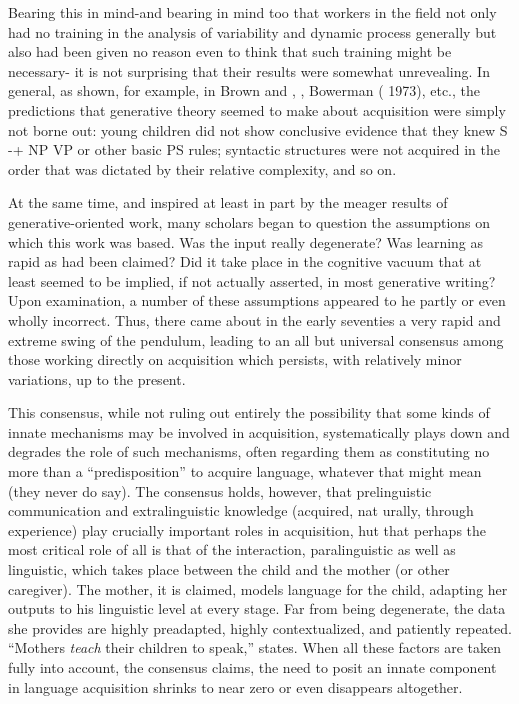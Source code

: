 Bearing this in mind-and bearing in mind too that workers in the field not only had no training in the analysis of variability and dynamic process generally but also had been given no reason even to think that such training might be necessary- it is not surprising that their results were somewhat unrevealing. In general, as shown, for example, in Brown and \citet{Hanlon1970}, \citet{Brown1973}, Bowerman ( 1973), etc., the predictions that generative theory seemed to make about acquisition were simply not borne out: young children did not
show conclusive evidence that they knew S -+ NP VP or other basic PS
rules; syntactic structures were not acquired in the order that was dictated by their relative complexity, and so on.

At the same time, and inspired at least in part by the meager results of generative-oriented work, many scholars began to question the assumptions on which this work was based. Was the input really degenerate? Was learning as rapid as had been claimed? Did it take place in the cognitive vacuum that at least seemed to be implied, if not actually asserted, in most generative writing? Upon examination, a number of these assumptions appeared to he partly or even wholly incorrect. Thus, there came about in the early seventies a very rapid and extreme swing of the pendulum, leading to an all but universal consensus among those working directly on acquisition which persists, with relatively minor variations, up to the present.

This consensus, while not ruling out entirely the possibility that some kinds of innate mechanisms may be involved in acquisition, systematically plays down and degrades the role of such mechanisms, often regarding them as constituting no more than a ``predisposition'' to acquire language, whatever that might mean (they never do say). The consensus holds, however, that prelinguistic communication and extralinguistic knowledge (acquired, nat urally, through experience) play crucially important roles in acquisition, hut that perhaps the most critical role of all is that of the interaction, paralinguistic as well as linguistic, which takes place between the child and the mother (or other caregiver). The mother, it is claimed, models language for the child, adapting her outputs to his linguistic level at every stage. Far from being degenerate, the data she provides are highly preadapted, highly contextualized, and patiently repeated. ``Mothers \textit{teach} their children to speak,'' \citet{Bruner1979} states. When all these factors are taken fully into account, the consensus claims, the need to posit an innate component in language acquisition shrinks to near zero or even disappears altogether.

